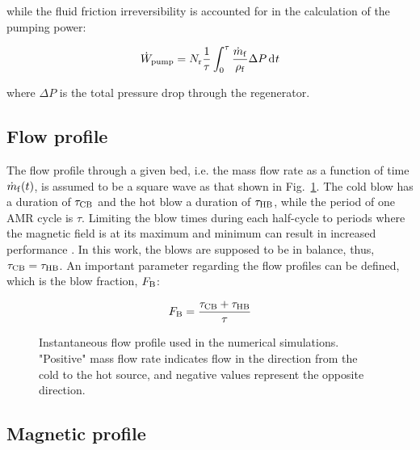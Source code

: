 \documentclass[draft]{svjour3}
\begin{document}
\noindent while the fluid friction irreversibility is accounted for in the calculation of the pumping power:

\begin{equation}
\label{eq:103}
\wpump = N\ped{r}\frac{1}{\tau}\int_0^{\tau}\frac{\rate{m}\ped{f}}{\rho\ped{f}} \Delta P \diffd{t}
\end{equation}

\noindent where $\Delta P$ is the total pressure drop through the regenerator.



\subsection{Flow profile}
\label{sec:flow-profile}


The flow profile through a given bed, i.e. the mass flow rate as a function of time $\dot{m}_{\mathrm{f}} (t)$, is assumed to be a square wave as that shown in Fig.~\ref{fig:mprofile}. The cold blow has a duration of $\tau_{\mathrm{CB}}$ and the  hot blow a duration of $\tau_{\mathrm{HB}}$, while the period of one AMR cycle is $\tau$. Limiting the blow times during each half-cycle to periods where the magnetic field is at its maximum and minimum can result in increased performance \cite{bib:nakashima17_avaliac}. In this work, the blows are supposed to be in balance, thus, $\tau_{\mathrm{CB}} = \tau_{\mathrm{HB}}$. An important parameter regarding the flow profiles can be defined, which is the blow fraction, $F_{\mathrm{B}}$:

\begin{equation}
  \label{eq:1}
  F_{\mathrm{B}} = \frac{\tau_{\mathrm{CB}} + \tau_{\mathrm{HB}}}{\tau}
\end{equation}

\begin{figure}[!ht]
  \centering
  \caption{Instantaneous flow profile used in the numerical simulations. "Positive" mass flow rate indicates flow in the direction from the cold to the hot source, and negative values represent the opposite direction. }
  \label{fig:mprofile}
\end{figure}

\subsection{Magnetic profile}
\label{sec:magnetic-profile}
\end{document}
